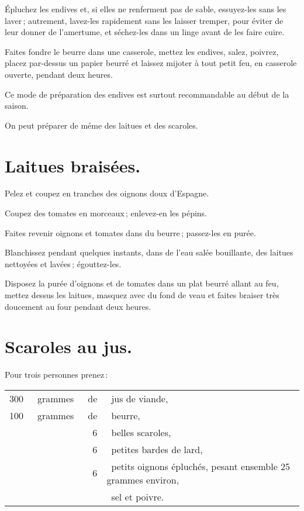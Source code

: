 Épluchez les endives et, si elles ne renferment pas de sable, essuyez-les sans les
laver ; autrement, lavez-les rapidement sans les laisser tremper, pour éviter de leur
donner de l'amertume, et séchez-les dans un linge avant de les faire cuire.

Faites fondre le beurre dans une casserole, mettez les endives, salez, poivrez,
placez par-dessus un papier beurré et laissez mijoter à tout petit feu, en
casserole ouverte, pendant deux heures.

Ce mode de préparation des endives est surtout recommandable au début de la
saison.

\sk

On peut préparer de méme des laitues et des scaroles.

\section*{\centering Laitues braisées.}
{}

Pelez et coupez en tranches des oignons doux d'Espagne.

Coupez des tomates en morceaux ; enlevez-en les pépins.

Faites revenir oignons et tomates dans du beurre ; passez-les en purée.

Blanchissez pendant quelques instants, dans de l’eau salée bouillante, des laitues
nettoyées et lavées ; égouttez-les.

Disposez la purée d'oignons et de tomates dans un plat beurré allant au feu,
mettez dessus les laitues, masquez avec du fond de veau et faites braiser très
doucement au four pendant deux heures.

\section*{\centering Scaroles au jus.}
{}

Pour trois personnes prenez :

\footnotesize
\begin{longtable}{rrrp{16em}}
    300 & grammes & de & jus de viande,                                                                   \\
    100 & grammes & de & beurre,                                                                          \\
        &         &  6 & belles scaroles,                                                                 \\
        &         &  6 & petites bardes de lard,                                                          \\
        &         &  6 & petits oignons épluchés, pesant ensemble 25 grammes environ,                     \\
        &         &    & sel et poivre.                                                                   \\
\end{longtable}
\normalsize

